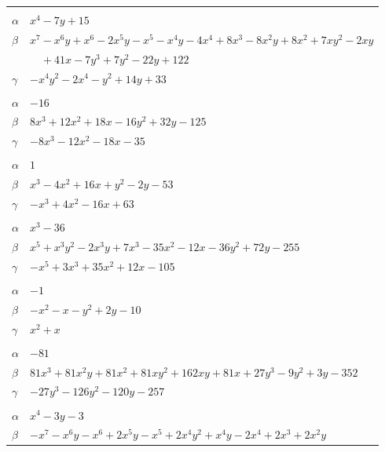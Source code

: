 \documentclass[11pt]{article}
\begin{document}
\begin{longtable}{@{}ll@{}}
\addlinespace[3pt]
\multicolumn{2}{@{}l}{$\{i,j\}=\{7,39\}$, $k_{ij}=2^{2}\cdot 5\cdot 7$}\\
$\alpha$ & $x^{4}-7y+15$\\
$\beta$ & $x^{7}-x^{6}y+x^{6}-2x^{5}y-x^{5}-x^{4}y-4x^{4}+8x^{3}-8x^{2}y+8x^{2}+7xy^{2}-2xy$\\
 & $\quad +41x-7y^{3}+7y^{2}-22y+122$\\
$\gamma$ & $-x^{4}y^{2}-2x^{4}-y^{2}+14y+33$\\
\addlinespace[3pt]
\multicolumn{2}{@{}l}{$\{i,j\}=\{8,12\}$, $k_{ij}=3\cdot 7\cdot 11$}\\
$\alpha$ & $-16$\\
$\beta$ & $8x^{3}+12x^{2}+18x-16y^{2}+32y-125$\\
$\gamma$ & $-8x^{3}-12x^{2}-18x-35$\\
\addlinespace[3pt]
\multicolumn{2}{@{}l}{$\{i,j\}=\{8,15\}$, $k_{ij}=3\cdot 7\cdot 11$}\\
$\alpha$ & $1$\\
$\beta$ & $x^{3}-4x^{2}+16x+y^{2}-2y-53$\\
$\gamma$ & $-x^{3}+4x^{2}-16x+63$\\
\addlinespace[3pt]
\multicolumn{2}{@{}l}{$\{i,j\}=\{8,24\}$, $k_{ij}=3^{2}\cdot 7^{2}$}\\
$\alpha$ & $x^{3}-36$\\
$\beta$ & $x^{5}+x^{3}y^{2}-2x^{3}y+7x^{3}-35x^{2}-12x-36y^{2}+72y-255$\\
$\gamma$ & $-x^{5}+3x^{3}+35x^{2}+12x-105$\\
\addlinespace[3pt]
\multicolumn{2}{@{}l}{$\{i,j\}=\{8,31\}$, $k_{ij}=3\cdot 7$}\\
$\alpha$ & $-1$\\
$\beta$ & $-x^{2}-x-y^{2}+2y-10$\\
$\gamma$ & $x^{2}+x$\\
\addlinespace[3pt]
\multicolumn{2}{@{}l}{$\{i,j\}=\{9,12\}$, $k_{ij}=2^{4}\cdot 11$}\\
$\alpha$ & $-81$\\
$\beta$ & $81x^{3}+81x^{2}y+81x^{2}+81xy^{2}+162xy+81x+27y^{3}-9y^{2}+3y-352$\\
$\gamma$ & $-27y^{3}-126y^{2}-120y-257$\\
\addlinespace[3pt]
\multicolumn{2}{@{}l}{$\{i,j\}=\{9,24\}$, $k_{ij}=2^{5}$}\\
$\alpha$ & $x^{4}-3y-3$\\
$\beta$ & $-x^{7}-x^{6}y-x^{6}+2x^{5}y-x^{5}+2x^{4}y^{2}+x^{4}y-2x^{4}+2x^{3}+2x^{2}y$\\

\end{longtable}
\end{document}
